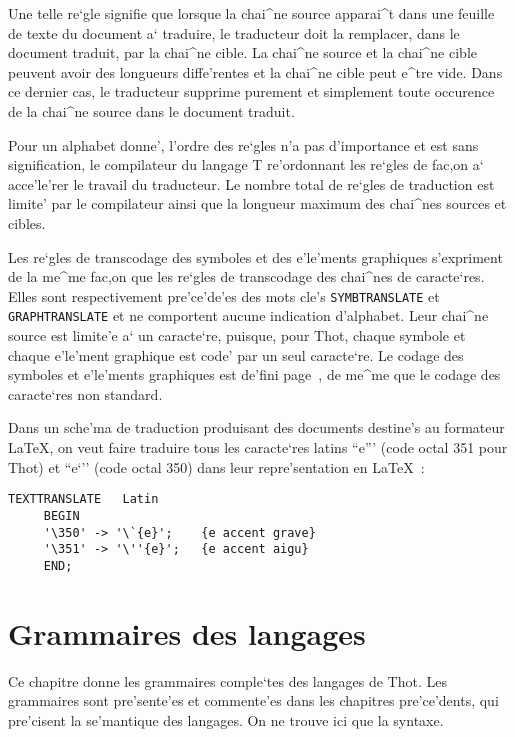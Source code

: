 {Une telle re`gle signifie que lorsque la chai^ne source apparai^t dans une
feuille de texte du document a` traduire, le traducteur doit la remplacer,
dans le document traduit, par la chai^ne cible. La chai^ne source et
la chai^ne cible peuvent avoir des longueurs diffe'rentes et la chai^ne
cible peut e^tre vide. Dans ce dernier cas, le traducteur supprime purement
et simplement toute occurence de la chai^ne source dans le document traduit.

Pour un alphabet donne',
l'ordre des re`gles n'a pas d'importance et est sans signification, le
compilateur du langage T re'ordonnant les re`gles de fac,on a` acce'le'rer le
travail du traducteur. Le nombre total de re`gles de traduction est limite'
par le compilateur ainsi que la longueur maximum des chai^nes sources
et cibles.

Les re`gles de transcodage des symboles et des e'le'ments graphiques
s'expriment de la me^me fac,on que les re`gles de transcodage des chai^nes
de caracte`res. Elles sont respectivement pre'ce'de'es des mots cle's
{\tt SYMBTRANSLATE} et {\tt GRAPHTRANSLATE} et ne comportent aucune indication
d'alphabet. Leur chai^ne source est
limite'e a` un caracte`re, puisque, pour Thot, chaque symbole et chaque
e'le'ment graphique est code' par un seul caracte`re. Le codage des symboles et
e'le'ments graphiques est de'fini page~\pageref{codage}, de me^me que le
codage des caracte`res non standard.

\begin{example}
Dans un sche'ma de traduction produisant des documents destine's au
formateur \LaTeX, on veut faire traduire tous les caracte`res latins ``e'''
(code octal 351 pour Thot) et ``e`'' (code octal 350) dans leur repre'sentation
en \LaTeX~:
\begin{verbatim}
TEXTTRANSLATE	Latin
     BEGIN
     '\350' -> '\`{e}';    {e accent grave}
     '\351' -> '\''{e}';   {e accent aigu}
     END;
\end{verbatim}
\end{example}


\chapter{Grammaires des langages}

Ce chapitre donne les grammaires comple`tes des langages de Thot. Les
grammaires sont pre'sente'es et commente'es dans les chapitres pre'ce'dents,
qui pre'cisent la se'mantique des langages. On ne trouve ici que la syntaxe.

}
